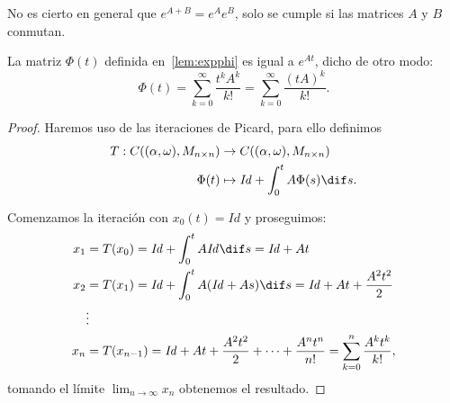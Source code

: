 \documentclass[../main.tex]{subfiles}
\begin{document}
\begin{remark}
	No es cierto en general que \(e^{A + B} = e^A e^B\), solo se cumple si las
	matrices \(A\) y \(B\) conmutan.
\end{remark}

\begin{theorem}
	La matriz \(\Phi(t)\) definida en~\ref{lem:expphi} es igual a \(e^{At}\),
	dicho de otro modo:
	\[\Phi(t) = \sum_{k = 0}^\infty \frac{t^k A^k}{k!} = 
		\sum_{k = 0}^\infty \frac{(tA)^k}{k!}.\]
\end{theorem}

\begin{proof}
	Haremos uso de las iteraciones de Picard, para ello definimos
	\begin{align*}
		T : C((\alpha, \omega), M_{n \times n}) &\to 
			C((\alpha, \omega), M_{n \times n}) \\
		\Phi(t) &\mapsto \mathit{Id} + \int_0^t A \Phi(s) \dif s.
	\end{align*}

	Comenzamos la iteración con \(x_0(t) = \mathit{Id}\) y proseguimos:
	\begin{align*}
		x_1 &= T(x_0) = \mathit{Id} + \int_0^t A \mathit{Id} \dif s = 
			\mathit{Id} + At \\
		x_2 &= T(x_1) = \mathit{Id} + \int_0^t A (\mathit{Id} + As) \dif s = 
			\mathit{Id} + At + \frac{A^2 t^2}{2} \\
		&\vdots \\
		x_n &= T(x_{n - 1}) =
			\mathit{Id} + At + \frac{A^2 t^2}{2} + \cdots + \frac{A^n t^n}{n!}
			= \sum_{k = 0}^n \frac{A^k t^k}{k!},
	\end{align*}
	tomando el límite \(\lim_{n \to \infty} x_n\) obtenemos el resultado.
\end{proof}
\end{document}
